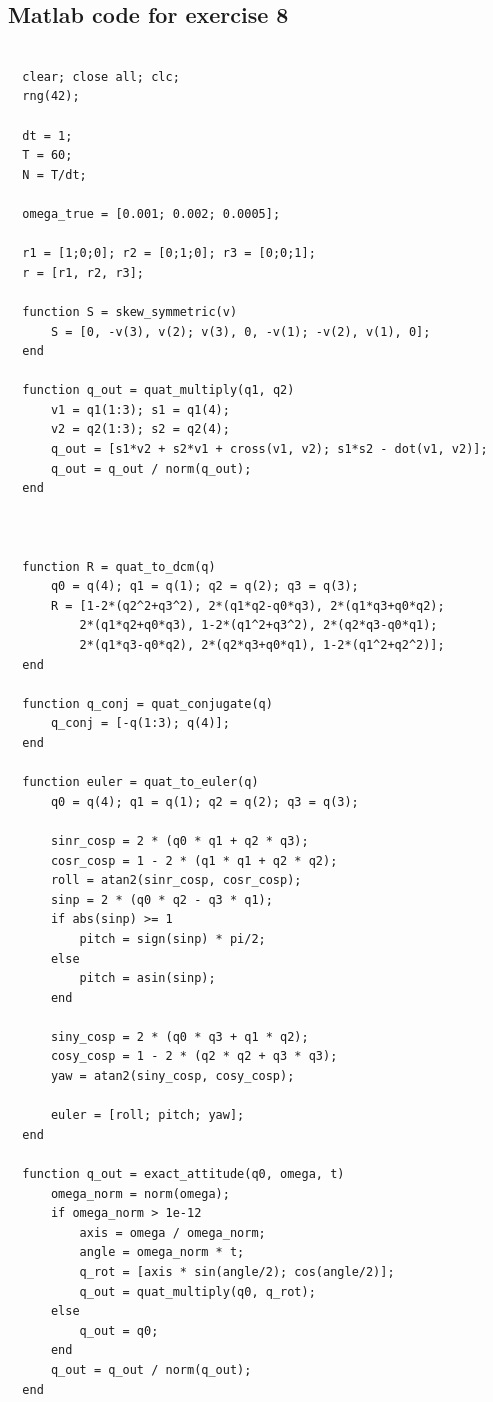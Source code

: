 \documentclass[12pt,A4, onecolumn]{exam}
\begin{document}
\begin{questions}
\begin{lstlisting}[style=matlabstyle]
\end{lstlisting}

\subsection{Matlab code for exercise 8}

\begin{lstlisting}[style=matlabstyle]
  % Exc 8

  clear; close all; clc;
  rng(42);

  dt = 1; 
  T = 60; 
  N = T/dt;

  omega_true = [0.001; 0.002; 0.0005]; 

  r1 = [1;0;0]; r2 = [0;1;0]; r3 = [0;0;1];
  r = [r1, r2, r3];

  function S = skew_symmetric(v)
      S = [0, -v(3), v(2); v(3), 0, -v(1); -v(2), v(1), 0];
  end

  function q_out = quat_multiply(q1, q2)
      v1 = q1(1:3); s1 = q1(4);
      v2 = q2(1:3); s2 = q2(4);
      q_out = [s1*v2 + s2*v1 + cross(v1, v2); s1*s2 - dot(v1, v2)];
      q_out = q_out / norm(q_out);
  end



  function R = quat_to_dcm(q)
      q0 = q(4); q1 = q(1); q2 = q(2); q3 = q(3);
      R = [1-2*(q2^2+q3^2), 2*(q1*q2-q0*q3), 2*(q1*q3+q0*q2);
          2*(q1*q2+q0*q3), 1-2*(q1^2+q3^2), 2*(q2*q3-q0*q1);
          2*(q1*q3-q0*q2), 2*(q2*q3+q0*q1), 1-2*(q1^2+q2^2)];
  end

  function q_conj = quat_conjugate(q)
      q_conj = [-q(1:3); q(4)];
  end

  function euler = quat_to_euler(q)
      q0 = q(4); q1 = q(1); q2 = q(2); q3 = q(3);
      
      sinr_cosp = 2 * (q0 * q1 + q2 * q3);
      cosr_cosp = 1 - 2 * (q1 * q1 + q2 * q2);
      roll = atan2(sinr_cosp, cosr_cosp);
      sinp = 2 * (q0 * q2 - q3 * q1);
      if abs(sinp) >= 1
          pitch = sign(sinp) * pi/2;
      else
          pitch = asin(sinp);
      end
      
      siny_cosp = 2 * (q0 * q3 + q1 * q2);
      cosy_cosp = 1 - 2 * (q2 * q2 + q3 * q3);
      yaw = atan2(siny_cosp, cosy_cosp);
      
      euler = [roll; pitch; yaw];
  end

  function q_out = exact_attitude(q0, omega, t)
      omega_norm = norm(omega);
      if omega_norm > 1e-12
          axis = omega / omega_norm;
          angle = omega_norm * t;
          q_rot = [axis * sin(angle/2); cos(angle/2)];
          q_out = quat_multiply(q0, q_rot);
      else
          q_out = q0;
      end
      q_out = q_out / norm(q_out);
  end


\end{lstlisting}
\end{questions}
\end{document}
